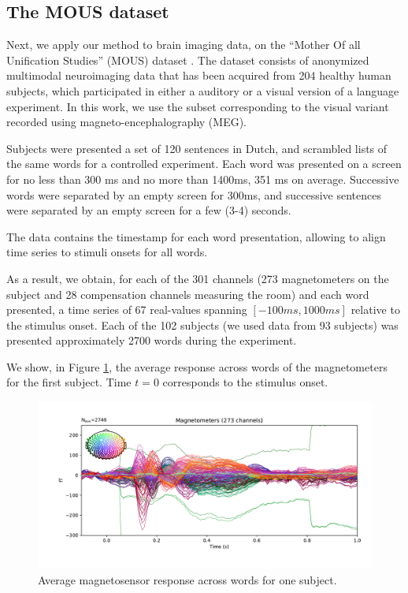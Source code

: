 \subsection{The MOUS dataset}

Next, we apply our method to brain imaging data, on the ``Mother Of all Unification
Studies'' (MOUS) dataset \cite{schoffelen2019204}. The dataset consists of
anonymized multimodal neuroimaging data that has been acquired from 204 healthy
human subjects, which participated in either a auditory or a visual version of a
language experiment. In this work, we use the subset corresponding to the visual
variant recorded using magneto-encephalography (MEG).

Subjects were presented a set of 120 sentences in Dutch, and scrambled lists
of the same words for a controlled experiment. Each word was presented on a
screen for no less than 300 ms and no more than 1400ms, 351 ms on average.
Successive words were separated by an empty screen for 300ms, and successive
sentences were separated by an empty screen for a few (3-4) seconds.

The data contains the timestamp for each word presentation, allowing to align
time series to stimuli onsets for all words.

As a result, we obtain, for each of the 301 channels (273 magnetometers on the
subject and 28 compensation channels measuring the room) and each word
presented, a time series of 67 real-values spanning $\left[-100ms, 1000ms\right]$ relative to
the stimulus onset. Each of the 102 subjects (we used data from 93 subjects) was
presented approximately 2700 words during the experiment.

We show, in Figure \ref{fig:megavg}, the average response across words of the 
magnetometers for the first subject. Time $t=0$ corresponds to the stimulus onset.

\begin{figure}
  \centering
  \includegraphics[width=\textwidth, trim=1.5cm 1cm 0.5cm 0cm, clip=True]{figure_meg.pdf}
  \caption{Average magnetosensor response across words for one subject.}
  \label{fig:megavg}
\end{figure}


